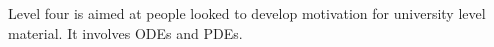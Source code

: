 Level four is aimed at people looked to develop motivation for university level
material. It involves ODEs and PDEs.

